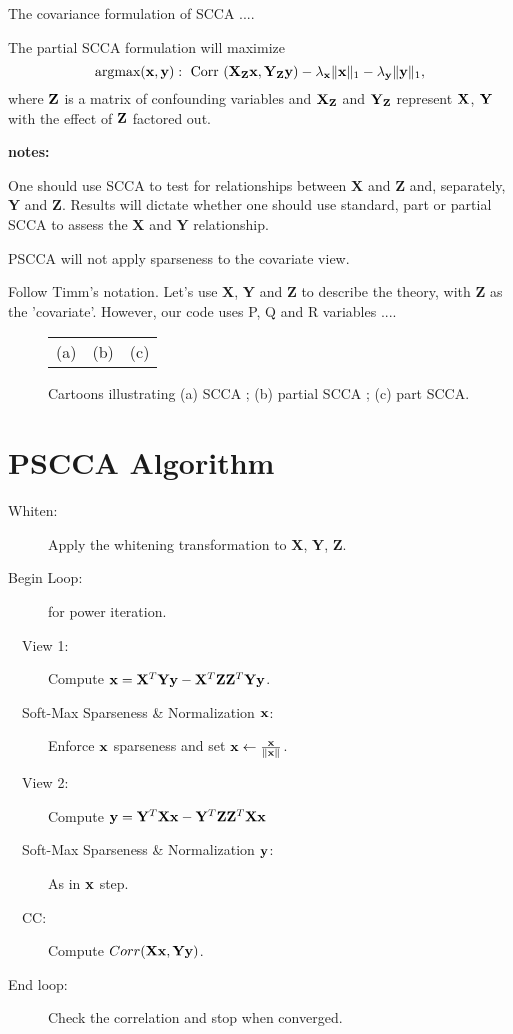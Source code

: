 \documentclass{llncs}
\newcommand{\X}{{\bf X}}
\newcommand{\x}{{\bf x}}
\newcommand{\Y}{{\bf Y}}
\newcommand{\y}{{\bf y}}
\newcommand{\Z}{{\bf Z}}
\begin{document}
The covariance formulation of SCCA .... 

The partial SCCA formulation will maximize 
\begin{equation}
\text{argmax}( \x,\y) :
~\text{Corr}~( \X_{\Z} \x , \Y_{\Z} \y) - \lambda_\x \| \x \|_1 - \lambda_\y \|  \y  \|_1 , 
\end{equation} 
where $\Z$ is a matrix of confounding variables and $\X_{\Z}$ and
$\Y_{\Z}$ represent $\X$, $\Y$ with the effect of $\Z$ factored out.

{\bf notes:}

One should use SCCA to test for relationships between {\X} and {\Z} and, separately, {\Y} and {\Z}.  Results will dictate whether
one should use standard, part or partial SCCA to assess the {\X} and {\Y}
relationship.

PSCCA will not apply sparseness to the covariate view.  

Follow Timm's notation.  Let's use {\X}, {\Y} and {\Z} to describe the theory, with {\Z} as the
'covariate'.   However, our code uses P, Q and R variables ....
 

\begin{figure}
\begin{center}
\begin{tabular}{ccc}
(a) & (b) & (c) \\
\end{tabular}
\end{center}
\caption{\baselineskip 12pt \small Cartoons illustrating (a) SCCA ;
  (b) partial SCCA ; (c) part SCCA.  }
\label{fig:cartoon}
\end{figure}

\section{PSCCA Algorithm}
\vspace{0.1in}
\vspace{-0.1in}
\begin{description}
\item [Whiten:]Apply the whitening transformation to {\X}, {\Y}, {\Z}.
\item [Begin Loop:]for power iteration. 
\item [~~View 1:]Compute  $\x= {\X}^T {\Y} \y -  {\X}^T  {\Z} {\Z}^T {\Y} \y$.
\item [~~Soft-Max Sparseness \& Normalization $\x$:] Enforce $\x$
  sparseness and set $\x \leftarrow \frac{\x}{\|\x\|}$.
\item [~~View 2:]Compute  $\y= {\Y}^T {\X} \x -  {\Y}^T  {\Z} {\Z}^T
  {\X} \x$
\item [~~Soft-Max Sparseness \& Normalization $\y$:] As in $\x$ step.
\item [~~CC:]Compute $Corr( {\X} \x ,  {\Y} \y )$.
\item [End loop:]Check the correlation and stop when converged.
\end{description}
 
\end{document}
